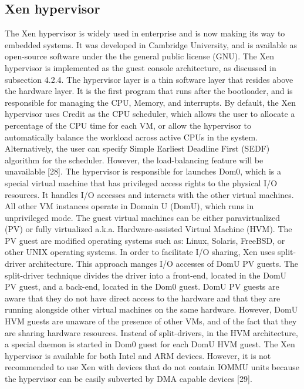 \subsection{Xen hypervisor}
The Xen hypervisor is widely used in enterprise and is now making its way
to embedded systems. It was developed in Cambridge University, and is
available as open-source software under the the general public license (GNU).
The Xen hypervisor is implemented as the guest console architecture, as
discussed in subsection 4.2.4. The hypervisor layer is a thin software layer
that resides above the hardware layer. It is the first program that runs
after the bootloader, and is responsible for managing the CPU, Memory, and
interrupts.
By default, the Xen hypervisor uses Credit as the CPU scheduler, which
allows the user to allocate a percentage of the CPU time for each VM, or allow
the hypervisor to automatically balance the workload across active CPUs in
the system. Alternatively, the user can specify Simple Earliest Deadline First
(SEDF) algorithm for the scheduler. However, the load-balancing feature will
be unavailable [28].
The hypervisor is responsible for launches Dom0, which is a special virtual
machine that has privileged access rights to the physical I/O resources. It
handles I/O accesses and interacts with the other virtual machines. All other
VM instances operate in Domain U (DomU), which runs in unprivileged mode. The guest virtual machines can be either paravirtualized (PV) or
fully virtualized {a.k.a. Hardware-assisted Virtual Machine (HVM)}. The
PV guest are modified operating systems such as: Linux, Solaris, FreeBSD,
or other UNIX operating systems. In order to facilitate I/O sharing, Xen
uses split-driver architecture. This approach manges I/O accesses of DomU
PV guests. The split-driver technique divides the driver into a front-end,
located in the DomU PV guest, and a back-end, located in the Dom0 guest.
DomU PV guests are aware that they do not have direct access to the
hardware and that they are running alongside other virtual machines on the
same hardware. However, DomU HVM guests are unaware of the presence
of other VMs, and of the fact that they are sharing hardware resources.
Instead of split-drivers, in the HVM architecture, a special daemon is started
in Dom0 guest for each DomU HVM guest. The Xen hypervisor is available
for both Intel and ARM devices. However, it is not recommended to use Xen
with devices that do not contain IOMMU units because the hypervisor can
be easily subverted by DMA capable devices [29].


